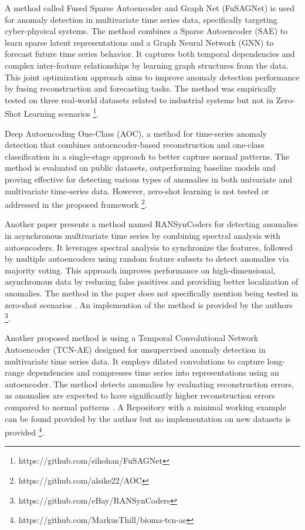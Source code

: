 A method called Fused Sparse Autoencoder and Graph Net (FuSAGNet) is used for anomaly detection in multivariate time series data, specifically targeting cyber-physical systems. The method combines a Sparse Autoencoder (SAE) to learn sparse latent representations and a Graph Neural Network (GNN) to forecast future time series behavior. It captures both temporal dependencies and complex inter-feature relationships by learning graph structures from the data. This joint optimization approach aims to improve anomaly detection performance by fusing reconstruction and forecasting tasks. The method was empirically tested on three real-world datasets related to industrial systems but not in Zero-Shot Learning scenarios \cite{han_learning_2022} \footnote{\fussy\tiny https://github.com/sihohan/FuSAGNet}.

Deep Autoencoding One-Class (AOC), a method for time-series anomaly detection that combines autoencoder-based reconstruction and one-class classification in a single-stage approach to better capture normal patterns. The method is evaluated on public datasets, outperforming baseline models and proving effective for detecting various types of anomalies in both univariate and multivariate time-series data. However, zero-shot learning is not tested or addressed in the proposed framework \cite{mou_deep_2023} \footnote{\fussy\tiny https://github.com/alsike22/AOC}.

Another paper presents a method named RANSynCoders for detecting anomalies in asynchronous multivariate time series by combining spectral analysis with autoencoders. It leverages spectral analysis to synchronize the features, followed by multiple autoencoders using random feature subsets to detect anomalies via majority voting. This approach improves performance on high-dimensional, asynchronous data by reducing false positives and providing better localization of anomalies. The method in the paper does not specifically mention being tested in zero-shot scenarios \cite{abdulaal_practical_2021}. An implemention of the method is provided by the authors \footnote{\fussy\tiny https://github.com/eBay/RANSynCoders}.

Another proposed method is using a Temporal Convolutional Network Autoencoder (TCN-AE) designed for unsupervised anomaly detection in multivariate time series data. It employs dilated convolutions to capture long-range dependencies and compresses time series into representations using an autoencoder. The method detects anomalies by evaluating reconstruction errors, as anomalies are expected to have significantly higher reconstruction errors compared to normal patterns \cite{thill_temporal_2021}. A Repository with a minimal working example can be found provided by the author but no implementation on new datasets is provided \footnote{\fussy\tiny https://github.com/MarkusThill/bioma-tcn-ae}.



